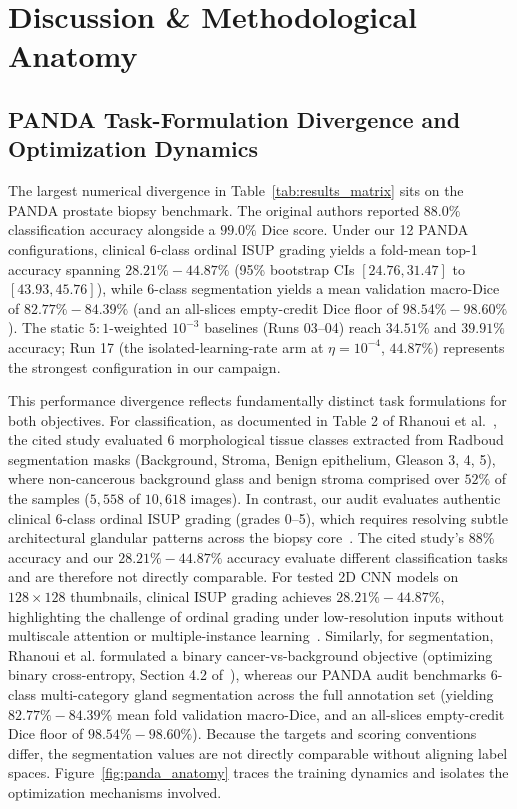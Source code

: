 \documentclass[preprint,12pt]{elsarticle}
\begin{document}
\section{Discussion \& Methodological Anatomy}

\subsection{PANDA Task-Formulation Divergence and Optimization Dynamics}\label{sec:panda}
The largest numerical divergence in Table~\ref{tab:results_matrix} sits on the PANDA prostate biopsy benchmark. The original authors reported $88.0\%$ classification accuracy alongside a $99.0\%$ Dice score. Under our 12 PANDA configurations, clinical 6-class ordinal ISUP grading yields a fold-mean top-1 accuracy spanning $28.21\%-44.87\%$ (95\% bootstrap CIs $[24.76, 31.47]$ to $[43.93, 45.76]$), while 6-class segmentation yields a mean validation macro-Dice of $82.77\%-84.39\%$ (and an all-slices empty-credit Dice floor of $98.54\%-98.60\%$). The static $5{:}1$-weighted $10^{-3}$ baselines (Runs 03--04) reach $34.51\%$ and $39.91\%$ accuracy; Run 17 (the isolated-learning-rate arm at $\eta=10^{-4}$, $44.87\%$) represents the strongest configuration in our campaign.

This performance divergence reflects fundamentally distinct task formulations for both objectives. For classification, as documented in Table 2 of Rhanoui et al.~\cite{rhanoui2025multitask}, the cited study evaluated 6 morphological tissue classes extracted from Radboud segmentation masks (Background, Stroma, Benign epithelium, Gleason 3, 4, 5), where non-cancerous background glass and benign stroma comprised over $52\%$ of the samples ($5,558$ of $10,618$ images). In contrast, our audit evaluates authentic clinical 6-class ordinal ISUP grading (grades 0--5), which requires resolving subtle architectural glandular patterns across the biopsy core~\cite{bulten2022artificial}. The cited study's $88\%$ accuracy and our $28.21\%-44.87\%$ accuracy evaluate different classification tasks and are therefore not directly comparable. For tested 2D CNN models on $128 \times 128$ thumbnails, clinical ISUP grading achieves $28.21\%-44.87\%$, highlighting the challenge of ordinal grading under low-resolution inputs without multiscale attention or multiple-instance learning~\cite{bulten2022artificial}. Similarly, for segmentation, Rhanoui et al. formulated a binary cancer-vs-background objective (optimizing binary cross-entropy, Section 4.2 of~\cite{rhanoui2025multitask}), whereas our PANDA audit benchmarks 6-class multi-category gland segmentation across the full annotation set (yielding $82.77\%-84.39\%$ mean fold validation macro-Dice, and an all-slices empty-credit Dice floor of $98.54\%-98.60\%$). Because the targets and scoring conventions differ, the segmentation values are not directly comparable without aligning label spaces. Figure~\ref{fig:panda_anatomy} traces the training dynamics and isolates the optimization mechanisms involved.
\end{document}
